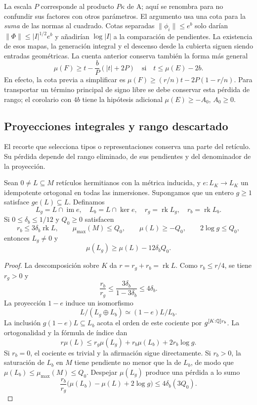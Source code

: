 La escala $P$ corresponde al producto $P\kappa$ de A; aquí se
renombra para no confundir sus factores con otros parámetros.
El argumento usa una cota para la \emph{suma} de las normas al
cuadrado. Cotas separadas $\|\phi_i\|\le e^b$ solo darían
$\|\Phi\|\le |I|^{1/2}e^b$ y añadirían $\log|I|$ a la
comparación de pendientes.
La existencia de esos mapas, la generación integral y el
descenso desde la cubierta siguen siendo entradas geométricas.
La cuenta anterior conserva también la forma más general
\[
 \mu(F)\ge t-\frac bP(|t|+2P)
 \quad\text{si}\quad t\le\mu(E)-2b.
\]
En efecto, la cota previa a simplificar es
$\mu(F)\ge(r/n)t-2P(1-r/n)$.
Para transportar un término principal de signo libre se debe
conservar esta pérdida de rango; el corolario con $4b$ tiene
la hipótesis adicional $\mu(E)\ge-A_0$, $A_0\ge0$.

\subsection{Proyecciones integrales y rango descartado}

El recorte que selecciona tipos o representaciones conserva
una parte del retículo. Su pérdida depende del rango eliminado,
de sus pendientes y del denominador de la proyección.

\begin{lema}
Sean $0\ne L\subseteq M$ retículos hermitianos con la métrica
inducida, y $e:L_K\to L_K$ un idempotente ortogonal en todas
las inmersiones. Supongamos que un entero $g\ge1$ satisface
$ge(L)\subseteq L$. Definamos
\[
 L_g=L\cap\operatorname{im}e,\quad
 L_b=L\cap\ker e,\quad
 r_g=\operatorname{rk}L_g,\quad r_b=\operatorname{rk}L_b.
\]
Si $0\le\delta_b\le1/12$ y $Q_0\ge0$ satisfacen
\[
 r_b\le3\delta_b\operatorname{rk}L,\qquad
 \mu_{\max}(M)\le Q_0,\qquad
 \mu(L)\ge-Q_0,\qquad 2\log g\le Q_0,
\]
entonces $L_g\ne0$ y
\begin{equation}
                \mu(L_g)\ge\mu(L)-12\delta_bQ_0.
 \label{eq:geom-proyeccion}
\end{equation}
\label{lem:geom-proyeccion}
\end{lema}

\begin{proof}
La descomposición sobre $K$ da $r=r_g+r_b=\operatorname{rk}L$.
Como $r_b\le r/4$, se tiene $r_g>0$ y
\[
             \frac{r_b}{r_g}
              \le\frac{3\delta_b}{1-3\delta_b}\le4\delta_b.
\]
La proyección $1-e$ induce un isomorfismo
\[
 L/(L_g\oplus L_b)\simeq(1-e)L/L_b.
\]
La inclusión $g(1-e)L\subseteq L_b$ acota el orden de este
cociente por $g^{[K:\mathbb{Q}]r_b}$.
La ortogonalidad y la fórmula de índice dan
\[
 r\mu(L)\le r_g\mu(L_g)+r_b\mu(L_b)+2r_b\log g.
\]
Si $r_b=0$, el cociente es trivial y la afirmación sigue
directamente. Si $r_b>0$, la saturación de $L_b$ en $M$
tiene pendiente no menor que la de $L_b$, de modo que
$\mu(L_b)\le\mu_{\max}(M)\le Q_0$.
Despejar $\mu(L_g)$ produce una pérdida a lo sumo
\[
 \frac{r_b}{r_g}\bigl(\mu(L_b)-\mu(L)+2\log g\bigr)
                    \le4\delta_b(3Q_0).
\]
\end{proof}

